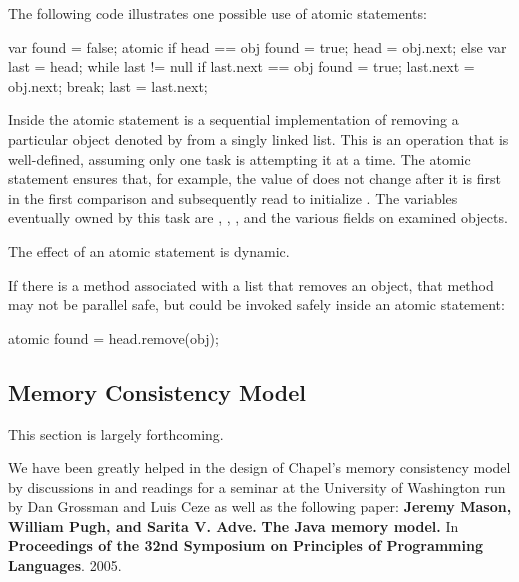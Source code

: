 \begin{example}
The following code illustrates one possible use of atomic statements:
\begin{chapel}
var found = false;
atomic {
  if head == obj {
    found = true;
    head = obj.next;
  } else {
    var last = head;
    while last != null {
      if last.next == obj {
        found = true;
        last.next = obj.next;
        break;
      }
      last = last.next;
    }
  }
}
\end{chapel}
Inside the atomic statement is a sequential implementation of removing
a particular object denoted by  from a singly linked list.
This is an operation that is well-defined, assuming only one task is
attempting it at a time. The atomic statement ensures that, for
example, the value of  does not change after it is first in
the first comparison and subsequently read to
initialize . The variables eventually owned by this task
are , , , and the various 
fields on examined objects.
\end{example}

The effect of an atomic statement is dynamic.

\begin{example}
If there is a method associated with a list that removes an object,
that method may not be parallel safe, but could be invoked safely inside an
atomic statement:
\begin{chapel}
atomic found = head.remove(obj);
\end{chapel}
\end{example}

\subsection{Memory Consistency Model}
\label{Memory_Consistency}

\begin{openissue}
This section is largely forthcoming.
\end{openissue}

We have been greatly helped in the design of Chapel's memory
consistency model by discussions in and readings for a seminar at the
University of Washington run by Dan Grossman and Luis Ceze as well as
the following paper: {\bf Jeremy Mason, William Pugh, and Sarita
V. Adve.}  {\bf The Java memory model.}  In {\bf Proceedings of the
32nd Symposium on Principles of Programming Languages}.  2005.

